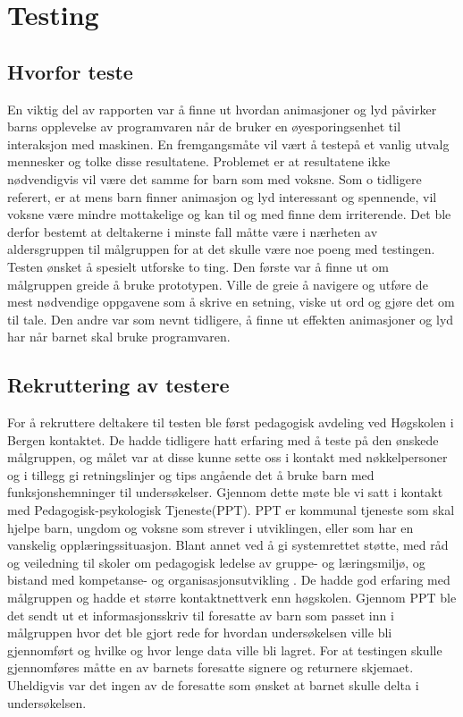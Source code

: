  
 
\chapter{Testing} 
 
 
 
\section{Hvorfor teste} 
 
 
En viktig del av rapporten var å finne ut hvordan animasjoner og lyd påvirker barns opplevelse av programvaren når de bruker en øyesporingsenhet til interaksjon med maskinen. En fremgangsmåte vil vært å testepå et vanlig utvalg mennesker og tolke disse resultatene. Problemet er at resultatene ikke nødvendigvis vil være det samme for barn som med voksne. Som o tidligere referert, er at mens barn finner animasjon og lyd interessant og spennende, vil voksne være mindre mottakelige og kan til og med finne dem irriterende. Det ble derfor bestemt at deltakerne i minste fall måtte være i nærheten av aldersgruppen til målgruppen for at det skulle være noe poeng med testingen. Testen ønsket å spesielt utforske to ting. Den første var å finne ut om målgruppen greide å bruke prototypen. Ville de greie å navigere og utføre de mest nødvendige oppgavene som å skrive en setning, viske ut ord og gjøre det om til tale. Den andre var som nevnt tidligere, å finne ut effekten animasjoner og lyd har når barnet skal bruke programvaren.  
 
 

\section{Rekruttering av testere} 
 
 
For å rekruttere deltakere til testen ble først pedagogisk avdeling ved Høgskolen i Bergen kontaktet. De hadde tidligere hatt erfaring med å teste på den ønskede målgruppen, og målet var at disse kunne sette oss i kontakt med nøkkelpersoner og i tillegg gi retningslinjer og tips angående det å bruke barn med funksjonshemninger til undersøkelser. Gjennom dette møte ble vi satt i kontakt med Pedagogisk-psykologisk Tjeneste(PPT). PPT er kommunal tjeneste som skal hjelpe barn, ungdom og voksne som strever i utviklingen, eller som har en vanskelig opplæringssituasjon. Blant annet ved å gi systemrettet støtte, med råd og veiledning til skoler om pedagogisk ledelse av gruppe- og læringsmiljø, og bistand med kompetanse- og organisasjonsutvikling \cite{Udir.5:online}. De hadde god erfaring med målgruppen og hadde et større kontaktnettverk enn høgskolen. Gjennom PPT ble det sendt ut et informasjonsskriv til foresatte av barn som passet inn i målgruppen hvor det ble gjort rede for hvordan undersøkelsen ville bli gjennomført og hvilke og hvor lenge data ville bli lagret. For at testingen skulle gjennomføres måtte en av barnets foresatte signere og returnere skjemaet. Uheldigvis var det ingen av de foresatte som ønsket at barnet skulle delta i undersøkelsen. 


